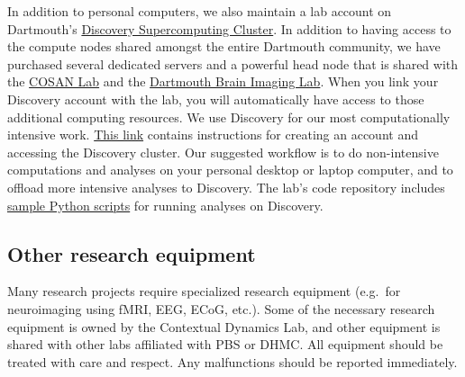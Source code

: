 \documentclass{tufte-book} %
\begin{document}
In addition to personal computers, we also maintain a lab account on
Dartmouth's \href{http://techdoc.dartmouth.edu/discovery/}{Discovery
  Supercomputing Cluster}.  In addition to having access to the
compute nodes shared amongst the entire Dartmouth community, we have
purchased several dedicated servers and a powerful head node that is
shared with the \href{http://www.cosanlab.com/}{COSAN Lab} and the
\href{http://www.dartmouth.edu/~bil/}{Dartmouth Brain Imaging Lab}.
When you link your Discovery account with the lab, you will
automatically have access to those additional computing resources.  We
use Discovery for our most computationally intensive work.
\href{https://trello-attachments.s3.amazonaws.com/56f548a3cb4847c27668e504/56f7ff07085632013a40545a/44c1921381d6193eca67e9c875a32960/discovery_cluster_tutorial.pdf}{This
  link} contains instructions for creating an account and accessing 	%
the Discovery cluster.  Our suggested workflow is to do non-intensive
computations and analyses on your personal desktop or laptop computer,
and to offload more intensive analyses to Discovery.  The lab's code
repository includes
\href{https://github.com/ContextLab/cluster-tools-dartmouth}{sample
  Python scripts} for running analyses on Discovery.

 \subsection{Other research equipment}
 Many research projects require specialized research equipment (e.g.\
 for neuroimaging using fMRI, EEG, ECoG, etc.).  Some of the necessary
 research equipment is owned by the Contextual Dynamics Lab, and other
 equipment is shared with other labs affiliated with PBS or DHMC.  All
 equipment should be treated with care and respect.  Any malfunctions
 should be reported immediately.
\end{document}
